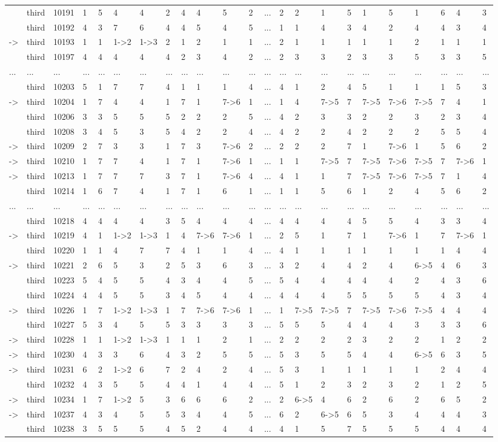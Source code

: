 \begin{landscape}
{\begin{longtable}{lllllllllllllllllllllll}
&third&10191&1&5&4&4&2&4&4&5&2&...&2&2&1&5&1&5&1&6&4&3\tabularnewline
&third&10192&4&3&7&6&4&4&5&4&5&...&1&1&4&3&4&2&4&4&3&4\tabularnewline
-\textgreater &third&10193&1&1&1-\textgreater 2&1-\textgreater 3&2&1&2&1&1&...&2&1&1&1&1&1&2&1&1&1\tabularnewline
&third&10197&4&4&4&4&4&2&3&4&2&...&2&3&3&2&3&3&5&3&3&5\tabularnewline
...&...&...&...&...&...&...&...&...&...&...&...&...&...&...&...&...&...&...&...&...&...&...\tabularnewline
&third&10203&5&1&7&7&4&1&1&1&4&...&4&1&2&4&5&1&1&1&5&3\tabularnewline
-\textgreater &third&10204&1&7&4&4&1&7&1&7-\textgreater 6&1&...&1&4&7-\textgreater 5&7&7-\textgreater 5&7-\textgreater 6&7-\textgreater 5&7&4&1\tabularnewline
&third&10206&3&3&5&5&5&2&2&2&5&...&4&2&3&3&2&2&3&2&3&4\tabularnewline
&third&10208&3&4&5&3&5&4&2&2&4&...&4&2&2&4&2&2&2&5&5&4\tabularnewline
-\textgreater &third&10209&2&7&3&3&1&7&3&7-\textgreater 6&2&...&2&2&2&7&1&7-\textgreater 6&1&5&6&2\tabularnewline
-\textgreater &third&10210&1&7&7&4&1&7&1&7-\textgreater 6&1&...&1&1&7-\textgreater 5&7&7-\textgreater 5&7-\textgreater 6&7-\textgreater 5&7&7-\textgreater 6&1\tabularnewline
-\textgreater &third&10213&1&7&7&7&3&7&1&7-\textgreater 6&4&...&4&1&1&7&7-\textgreater 5&7-\textgreater 6&7-\textgreater 5&7&1&4\tabularnewline
&third&10214&1&6&7&4&1&7&1&6&1&...&1&1&5&6&1&2&4&5&6&2\tabularnewline
...&...&...&...&...&...&...&...&...&...&...&...&...&...&...&...&...&...&...&...&...&...&...\tabularnewline
&third&10218&4&4&4&4&3&5&4&4&4&...&4&4&4&4&5&5&4&3&3&4\tabularnewline
-\textgreater &third&10219&4&1&1-\textgreater 2&1-\textgreater 3&1&4&7-\textgreater 6&7-\textgreater 6&1&...&2&5&1&7&1&7-\textgreater 6&1&7&7-\textgreater 6&1\tabularnewline
&third&10220&1&1&4&7&7&4&1&1&4&...&4&1&1&1&1&1&1&1&4&4\tabularnewline
\newpage
-\textgreater &third&10221&2&6&5&3&2&5&3&6&3&...&3&2&4&4&2&4&6-\textgreater 5&4&6&3\tabularnewline
&third&10223&5&4&5&5&4&3&4&4&5&...&5&4&4&4&4&4&2&4&3&6\tabularnewline
&third&10224&4&4&5&5&3&4&5&4&4&...&4&4&4&5&5&5&5&4&3&4\tabularnewline
-\textgreater &third&10226&1&7&1-\textgreater 2&1-\textgreater 3&1&7&7-\textgreater 6&7-\textgreater 6&1&...&1&7-\textgreater 5&7-\textgreater 5&7&7-\textgreater 5&7-\textgreater 6&7-\textgreater 5&4&4&4\tabularnewline
&third&10227&5&3&4&5&5&3&3&3&3&...&5&5&5&4&4&4&3&3&3&6\tabularnewline
-\textgreater &third&10228&1&1&1-\textgreater 2&1-\textgreater 3&1&1&1&2&1&...&2&2&2&2&3&2&2&1&2&2\tabularnewline
-\textgreater &third&10230&4&3&3&6&4&3&2&5&5&...&5&3&5&5&4&4&6-\textgreater 5&6&3&5\tabularnewline
-\textgreater &third&10231&6&2&1-\textgreater 2&6&7&2&4&2&4&...&5&3&1&1&1&1&1&2&4&4\tabularnewline
&third&10232&4&3&5&5&4&4&1&4&4&...&5&1&2&3&2&3&2&1&2&5\tabularnewline
-\textgreater &third&10234&1&7&1-\textgreater 2&5&3&6&6&6&2&...&2&6-\textgreater 5&4&6&2&6&2&6&5&2\tabularnewline
-\textgreater &third&10237&4&3&4&5&5&3&4&4&5&...&6&2&6-\textgreater 5&6&5&3&4&4&4&3\tabularnewline
&third&10238&3&5&5&5&4&5&2&4&4&...&4&1&5&7&5&5&5&4&4&4\tabularnewline
\hline
\end{longtable}}\end{landscape}


